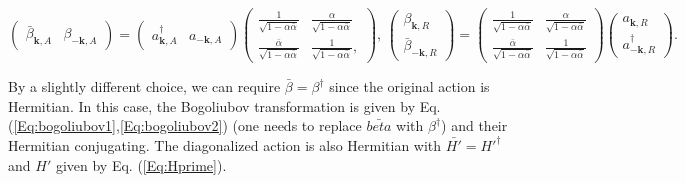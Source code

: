 \documentclass[aps,onecolumn,superscriptaddress,notitlepage,longbibliography]{revtex4-1}
\newcommand{\tmmathbf}[1]{\ensuremath{\boldsymbol{#1}}}
\begin{document}
\begin{equation}
\left(\begin{array}{cc}\bar{\beta}_{\tmmathbf{k}, A} &
  \beta_{- \tmmathbf{k}, A}\end{array}\right) = \left(\begin{array}{cc}a^{\dagger}_{\tmmathbf{k}, A} &
  a_{- \tmmathbf{k}, A}\end{array}\right)\left(\begin{array}{cc}
  \frac{1}{\sqrt{1 - \alpha \bar{\alpha}}} & \frac{\alpha}{\sqrt{1 - \alpha
  \bar{\alpha}}}\\
  \frac{\bar{\alpha}}{\sqrt{1 - \alpha \bar{\alpha}}} & \frac{1}{\sqrt{1 -
  \alpha \bar{\alpha}}},
  \end{array}\right), \,
  \left(\begin{array}{c}
    \beta_{\tmmathbf{k}, R}\\
    \bar{\beta}_{- \tmmathbf{k}, R}
  \end{array}\right) = \left(\begin{array}{cc}
    \frac{1}{\sqrt{1 - \alpha \bar{\alpha}}} & \frac{\alpha}{\sqrt{1 - \alpha
    \bar{\alpha}}}\\
    \frac{\bar{\alpha}}{\sqrt{1 - \alpha \bar{\alpha}}} & \frac{1}{\sqrt{1 -
    \alpha \bar{\alpha}}}
  \end{array}\right) \left(\begin{array}{c}
    a_{\tmmathbf{k}, R}\\
    a^{\dagger}_{- \tmmathbf{k}, R}
  \end{array}\right) .
\end{equation}

By a slightly different choice, we can require $\bar{\beta}=\beta^\dagger$ since the original action is Hermitian. In this case, the Bogoliubov transformation is given by Eq. (\ref{Eq:bogoliubov1},\ref{Eq:bogoliubov2}) (one needs to replace $\bar{beta}$ with $\beta^\dagger$) and their Hermitian conjugating. The diagonalized action is also Hermitian with $\bar{H'}=H'^\dagger$ and $H'$ given by Eq. (\ref{Eq:Hprime}).
\end{document}
